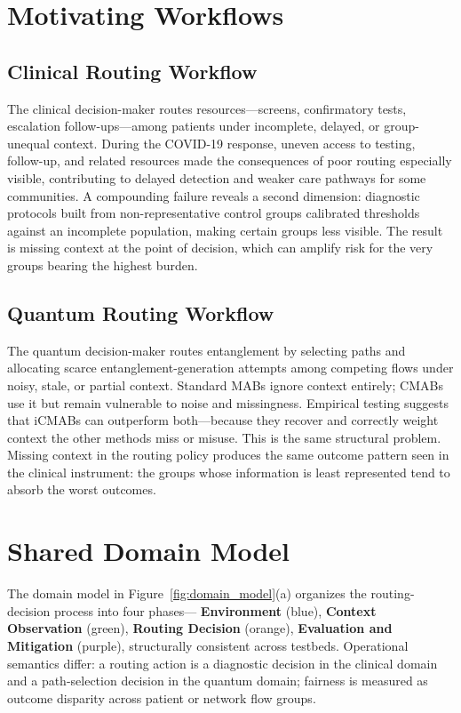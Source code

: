 \documentclass{IEEEtran}
\begin{document}
\section{Motivating Workflows}

\subsection{Clinical Routing Workflow}
The clinical decision-maker routes resources---screens, confirmatory tests,
escalation follow-ups---among patients under incomplete, delayed, or
group-unequal context. During the COVID-19 response, uneven access to testing,
follow-up, and related resources made the consequences of poor routing
especially visible, contributing to delayed detection and weaker care pathways
for some communities. A compounding failure reveals a second dimension:
diagnostic protocols built from non-representative control groups calibrated
thresholds against an incomplete population, making certain groups less visible. The
result is missing context at the point of decision, which can amplify risk for
the very groups bearing the highest burden.

\subsection{Quantum Routing Workflow}
The quantum decision-maker routes entanglement by selecting paths and
allocating scarce entanglement-generation attempts among competing flows
under noisy, stale, or partial context. Standard MABs ignore context
entirely; CMABs use it but remain vulnerable to noise and missingness.
Empirical testing suggests that iCMABs can outperform both---because they
recover and correctly weight context the other methods miss or misuse.
This is the same structural problem. Missing context
in the routing policy produces the same outcome pattern seen in the clinical
instrument: the groups whose information is least represented tend to absorb
the worst outcomes.

\section{Shared Domain Model}

The domain model in Figure~\ref{fig:domain_model}(a) organizes the
routing-decision process into four phases---
\textcolor{phase1blue}{\textbf{Environment}} (blue),
\textcolor{phase2green}{\textbf{Context Observation}} (green),
\textcolor{phase3orange}{\textbf{Routing Decision}} (orange),
\textcolor{phase4purple}{\textbf{Evaluation and Mitigation}} (purple), structurally 
consistent across testbeds. Operational semantics differ: a routing action is 
a diagnostic decision in the clinical domain and a path-selection decision in the 
quantum domain; fairness is measured as outcome disparity across patient or network flow groups.
\end{document}
